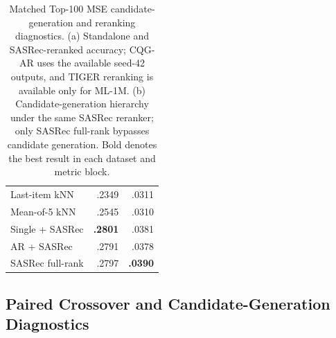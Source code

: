 \documentclass[letterpaper]{article}
\begin{document}
\begin{table}[H]
\begin{minipage}[t]{0.36\textwidth}
\begin{tabular}{lrr}
Last-item kNN & .2349 & .0311 \\
Mean-of-5 kNN & .2545 & .0310 \\
Single + SASRec & \textbf{.2801} & .0381 \\
AR + SASRec & .2791 & .0378 \\
SASRec full-rank & .2797 & \textbf{.0390} \\
\bottomrule
\end{tabular}
\end{minipage}
\caption{Matched Top-100 MSE candidate-generation and reranking diagnostics.
(a) Standalone and SASRec-reranked accuracy; CQG-AR uses the available
seed-42 outputs, and TIGER reranking is available only for ML-1M.
(b) Candidate-generation hierarchy under the same SASRec reranker; only
SASRec full-rank bypasses candidate generation. Bold denotes the best result
in each dataset and metric block.}
\label{tab:mse-rerank}
\label{tab:retrieval-hierarchy}
\end{table}


\subsection{Paired Crossover and Candidate-Generation Diagnostics}
\label{app:crossover-values}
\end{document}
